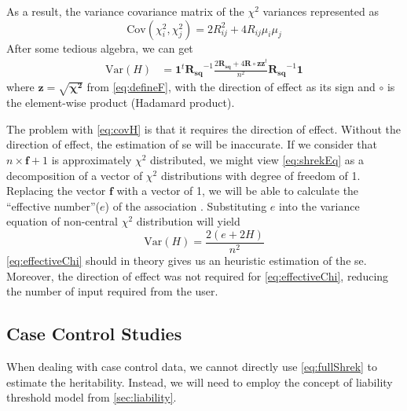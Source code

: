 \documentclass[12pt]{scrbook}
\begin{document}
As a result, the variance covariance matrix of the $\chi^2$ variances represented as
\begin{equation}
\mathrm{Cov}(\chi_i^2,\chi_j^2) = 2R_{ij}^2+4R_{ij}\mu_i\mu_j
\label{eq:finalChi}
\end{equation}
After some tedious algebra, we can get 
\begin{align}
\mathrm{Var}(H) &=\boldsymbol{1}^t\boldsymbol{R_{sq}}^{-1}\frac{2\boldsymbol{R_{sq}}+4\boldsymbol{R}\circ \boldsymbol{zz}^t}{n^2}\boldsymbol{R_{sq}}^{-1}\boldsymbol{1}
\label{eq:covH}
\end{align}
where $\boldsymbol{z} = \sqrt{\boldsymbol{\chi^2}}$ from \cref{eq:defineF}, with the direction of effect as its sign and $\circ$ is the element-wise product (Hadamard product).

The problem with \cref{eq:covH} is that it requires the direction of effect. 
Without the direction of effect, the estimation of \gls{se} will be inaccurate. 
If we consider that $n\times \boldsymbol{f}+1$ is approximately $\chi^2$ distributed, we might view \cref{eq:shrekEq} as a decomposition of a vector of $\chi^2$ distributions with degree of freedom of 1. 
Replacing the vector $\boldsymbol{f}$ with a vector of 1, we will be able to calculate the ``effective number''($e$) of the association \citep{Li2011}. 
Substituting $e$ into the variance equation of non-central $\chi^2$ distribution will yield
\begin{equation}
\mathrm{Var}(H) = \frac{2(e+2H)}{n^2}
\label{eq:effectiveChi}
\end{equation}
\cref{eq:effectiveChi} should in theory gives us an heuristic estimation of the \gls{se}. 
Moreover, the direction of effect was not required for \cref{eq:effectiveChi}, reducing the number of input required from the user.

\subsection{Case Control Studies}	 
When dealing with case control data, we cannot directly use \cref{eq:fullShrek} to estimate the heritability.
Instead, we will need to employ the concept of liability threshold model from \cref{sec:liability}. 
\end{document}
